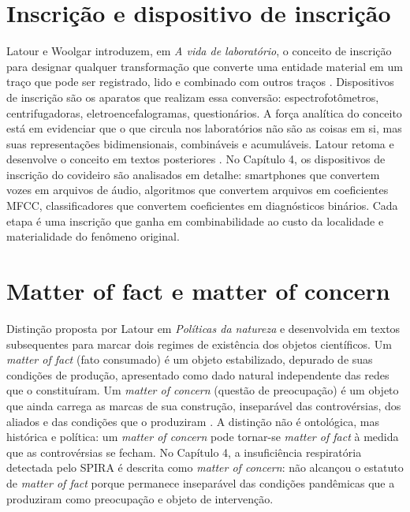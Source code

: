\begin{description}
\bigskip

\section*{Inscrição e dispositivo de inscrição}

Latour e Woolgar introduzem, em \textit{A vida de laboratório}, o conceito de inscrição para designar qualquer transformação que converte uma entidade material em um traço que pode ser registrado, lido e combinado com outros traços \parencite[p.~45--51]{Latour1997VidaLaboratorio}. Dispositivos de inscrição são os aparatos que realizam essa conversão: espectrofotômetros, centrifugadoras, eletroencefalogramas, questionários. A força analítica do conceito está em evidenciar que o que circula nos laboratórios não são as coisas em si, mas suas representações bidimensionais, combináveis e acumuláveis. Latour retoma e desenvolve o conceito em textos posteriores \parencite{Latour2017Esperanca, Latour1990Drawing}. No Capítulo 4, os dispositivos de inscrição do covideiro são analisados em detalhe: smartphones que convertem vozes em arquivos de áudio, algoritmos que convertem arquivos em coeficientes MFCC, classificadores que convertem coeficientes em diagnósticos binários. Cada etapa é uma inscrição que ganha em combinabilidade ao custo da localidade e materialidade do fenômeno original.

\bigskip

\section*{Matter of fact e matter of concern}

Distinção proposta por Latour em \textit{Políticas da natureza} e desenvolvida em textos subsequentes para marcar dois regimes de existência dos objetos científicos. Um \textit{matter of fact} (fato consumado) é um objeto estabilizado, depurado de suas condições de produção, apresentado como dado natural independente das redes que o constituíram. Um \textit{matter of concern} (questão de preocupação) é um objeto que ainda carrega as marcas de sua construção, inseparável das controvérsias, dos aliados e das condições que o produziram \parencite{latour2004politics}. A distinção não é ontológica, mas histórica e política: um \textit{matter of concern} pode tornar-se \textit{matter of fact} à medida que as controvérsias se fecham. No Capítulo 4, a insuficiência respiratória detectada pelo SPIRA é descrita como \textit{matter of concern}: não alcançou o estatuto de \textit{matter of fact} porque permanece inseparável das condições pandêmicas que a produziram como preocupação e objeto de intervenção.


\end{description}
